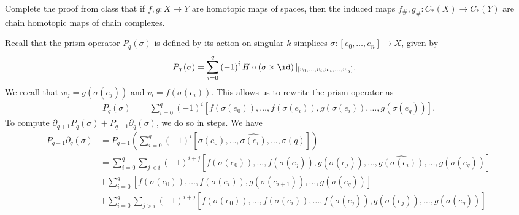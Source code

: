 \documentclass[10pt]{mypackage}
\begin{document}
\RaggedRight
\begin{problem}
  Complete the proof from class that if $f,g\colon X\rightarrow Y$ are homotopic maps of spaces, then the induced maps $f_{\#},g_{\#}\colon C_{\ast}\left( X \right)\rightarrow C_{\ast}\left( Y \right)$ are chain homotopic maps of chain complexes.
\end{problem}
\begin{solution}
  Recall that the prism operator $P_q\left( \sigma \right)$ is defined by its action on singular $k$-simplices $\sigma\colon \left[ e_0,\dots,e_n \right]\rightarrow X$, given by
  \begin{align*}
    P_q\left( \sigma \right) &= \sum_{i=0}^{q} \left( -1 \right)^{i} H\circ \left( \sigma\times \id \right)|_{\left[ v_0,\dots,v_i,w_i,\dots,w_q \right]}.
  \end{align*}
  We recall that $w_j = g\left( \sigma\left( e_j \right) \right)$ and $v_i = f\left( \sigma\left( e_i \right) \right)$. This allows us to rewrite the prism operator as
  \begin{align*}
    P_q\left( \sigma \right) &= \sum_{i=0}^{q} \left( -1 \right)^{i} \left[ f\left( \sigma\left( e_0 \right) \right),\dots,f\left( \sigma\left( e_i \right) \right),g\left( \sigma\left( e_i \right) \right),\dots,g\left( \sigma\left( e_q \right) \right) \right].
  \end{align*}
  To compute $\partial_{q+1}P_q\left( \sigma \right) + P_{q-1}\partial_{q}\left( \sigma \right)$, we do so in steps. We have
  \begin{align*}
    P_{q-1}\partial_q\left( \sigma \right) &= P_{q-1}\left( \sum_{i=0}^{q}\left( -1 \right)^{i}\left[ \sigma\left( e_0 \right),\dots,\widehat{\sigma\left( e_i \right)},\dots,\sigma\left( q \right) \right] \right)\\
                                           &= \sum_{i=0}^{q}\sum_{j < i}\left( -1 \right)^{i+j}\left[ f\left( \sigma\left( e_0 \right) \right),\dots, f\left( \sigma\left( e_j \right) \right),g\left( \sigma\left( e_j \right) \right),\dots,\widehat{g\left( \sigma\left( e_i \right) \right)},\dots,g\left( \sigma\left( e_q \right) \right) \right]\tag{A1}\\
                                           &+ \sum_{i=0}^{q} \left[ f\left( \sigma\left( e_0 \right) \right),\dots,f\left( \sigma\left( e_i \right) \right),g\left( \sigma\left( e_{i+1} \right) \right),\dots,g\left( \sigma\left( e_q \right) \right) \right]\tag{A2}\\
                                           &+ \sum_{i=0}^{q}\sum_{j> i}\left( -1 \right)^{i+j}\left[ f\left( \sigma\left( e_0 \right) \right),\dots,\widehat{f\left( \sigma\left( e_i \right) \right)},\dots,f\left( \sigma\left( e_j \right) \right),g\left( \sigma\left( e_j \right) \right),\dots,g\left( \sigma\left( e_q \right) \right) \right]\tag{A3}\\

\end{align*}
\end{solution}
\end{document}
